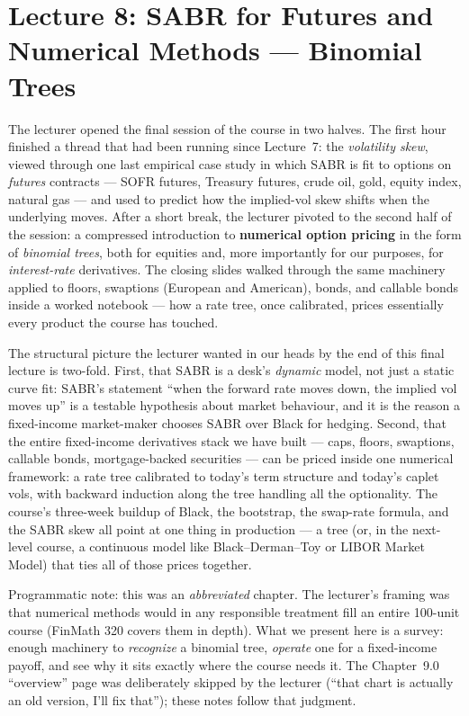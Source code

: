 \part*{Lecture 8: SABR for Futures and Numerical Methods --- Binomial Trees}

The lecturer opened the final session of the course in two halves. The
first hour finished a thread that had been running since Lecture~7:
the \emph{volatility skew}, viewed through one last empirical case
study in which SABR is fit to options on \emph{futures} contracts ---
SOFR futures, Treasury futures, crude oil, gold, equity index,
natural gas --- and used to predict how the implied-vol skew shifts
when the underlying moves. After a short break, the lecturer pivoted
to the second half of the session: a compressed introduction to
\textbf{numerical option pricing} in the form of \emph{binomial trees},
both for equities and, more importantly for our purposes, for
\emph{interest-rate} derivatives. The closing slides walked through
the same machinery applied to floors, swaptions (European and
American), bonds, and callable bonds inside a worked notebook ---
how a rate tree, once calibrated, prices essentially every product
the course has touched.

The structural picture the lecturer wanted in our heads by the end
of this final lecture is two-fold. First, that SABR is a desk's
\emph{dynamic} model, not just a static curve fit: SABR's statement
``when the forward rate moves down, the implied vol moves up'' is a
testable hypothesis about market behaviour, and it is the reason a
fixed-income market-maker chooses SABR over Black for hedging.
Second, that the entire fixed-income derivatives stack we have built
--- caps, floors, swaptions, callable bonds, mortgage-backed securities
--- can be priced inside one numerical framework: a rate tree
calibrated to today's term structure and today's caplet vols, with
backward induction along the tree handling all the optionality. The
course's three-week buildup of Black, the bootstrap, the swap-rate
formula, and the SABR skew all point at one thing in production
--- a tree (or, in the next-level course, a continuous model like
Black--Derman--Toy or LIBOR Market Model) that ties all of those
prices together.

Programmatic note: this was an \emph{abbreviated} chapter. The
lecturer's framing was that numerical methods would in any responsible
treatment fill an entire 100-unit course (FinMath 320 covers them in
depth). What we present here is a survey: enough machinery to
\emph{recognize} a binomial tree, \emph{operate} one for a
fixed-income payoff, and see why it sits exactly where the course
needs it. The Chapter~9.0 ``overview'' page was deliberately skipped
by the lecturer (``that chart is actually an old version, I'll fix
that''); these notes follow that judgment.

